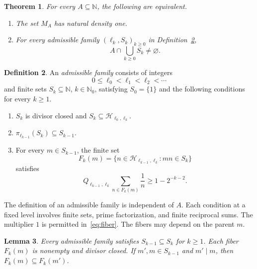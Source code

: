\documentclass[11pt]{amsart}
\newtheorem{theorem}{Theorem}[section]
\newtheorem{lemma}[theorem]{Lemma}
\theoremstyle{definition}
\newtheorem{definition}[theorem]{Definition}
\numberwithin{equation}{section}
\newcommand{\N}{\mathbb N}
\newcommand{\Nzero}{\mathbb N_0}
\newcommand{\Hblock}[2]{\mathcal H_{#1,#2}}
\begin{document}
\begin{theorem}\label{thm:main}
For every $A\subseteq\N$, the following are equivalent.
\begin{enumerate}[label=\textup{(\roman*)},leftmargin=2.4em,itemsep=3pt]
  \item The set $M_A$ has natural density one.
  \item For every admissible family $(\ell_k,S_k)_{k\geq0}$ in Definition~\ref{def:admissible},
  \begin{equation}\label{eq:criterion}
    A\cap\bigcup_{k\geq0}S_k\neq\varnothing.
  \end{equation}
\end{enumerate}
\end{theorem}

\begin{definition}\label{def:admissible}
An \emph{admissible family} consists of integers
\[
  0\leq\ell_0<\ell_1<\ell_2<\cdots
\]
and finite sets $S_k\subseteq\N$, $k\in\Nzero$, satisfying $S_0=\{1\}$ and the following conditions for every $k\geq1$.
\begin{enumerate}[label=\textup{(\roman*)},leftmargin=2.4em,itemsep=3pt]
  \item\label{ad:support} $S_k$ is divisor closed and $S_k\subseteq\Hblock{\ell_0}{\ell_k}$.
  \item\label{ad:projection} $\pi_{\ell_{k-1}}(S_k)\subseteq S_{k-1}$.
  \item\label{ad:retention} For every $m\in S_{k-1}$, the finite set
  \begin{equation}\label{eq:fiber}
    F_k(m)=\{n\in\Hblock{\ell_{k-1}}{\ell_k}: mn\in S_k\}
  \end{equation}
  satisfies
  \begin{equation}\label{eq:retention}
    Q_{\ell_{k-1},\ell_k}\sum_{n\in F_k(m)}\frac1n
       \geq 1-2^{-k-2}.
  \end{equation}
\end{enumerate}
\end{definition}

The definition of an admissible family is independent of $A$.
Each condition at a fixed level involves finite sets, prime factorization, and finite reciprocal sums.
The multiplier $1$ is permitted in~\eqref{eq:fiber}.
The fibers may depend on the parent $m$.

\begin{lemma}\label{lem:family-properties}
Every admissible family satisfies $S_{k-1}\subseteq S_k$ for $k\geq1$.
Each fiber $F_k(m)$ is nonempty and divisor closed.
If $m',m\in S_{k-1}$ and $m'\mid m$, then $F_k(m)\subseteq F_k(m')$.
\end{lemma}
\end{document}

